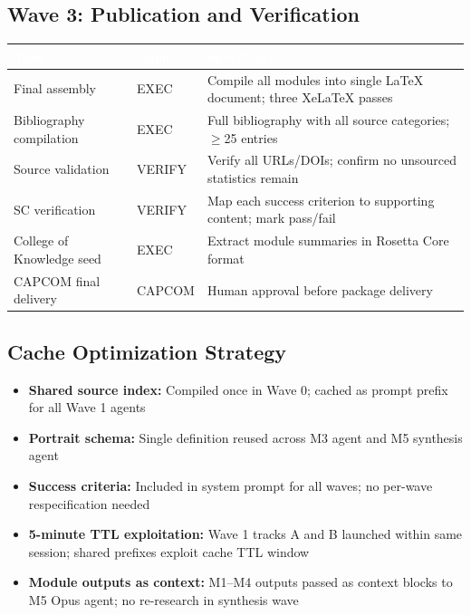 \documentclass[11pt,letterpaper]{article}
\newcommand{\tableheader}[1]{\textbf{\sffamily\textcolor{white}{#1}}}
\begin{document}
\subsection{Wave 3: Publication and Verification}

\begin{center}
\begin{tabularx}{\textwidth}{L{3cm}L{2cm}X}
\toprule
{}
\tableheader{Task} & \tableheader{Agent} & \tableheader{Specification} \\
\midrule
Final assembly & EXEC & Compile all modules into single LaTeX document; three XeLaTeX passes \\
Bibliography compilation & EXEC & Full bibliography with all source categories; $\geq$25 entries \\
Source validation & VERIFY & Verify all URLs/DOIs; confirm no unsourced statistics remain \\
SC verification & VERIFY & Map each success criterion to supporting content; mark pass/fail \\
College of Knowledge seed & EXEC & Extract module summaries in Rosetta Core format \\
CAPCOM final delivery & CAPCOM & Human approval before package delivery \\
\bottomrule
\end{tabularx}
\end{center}

\subsection{Cache Optimization Strategy}

\begin{itemize}[leftmargin=*]
  \item \textbf{Shared source index:} Compiled once in Wave 0; cached as prompt prefix for all Wave 1 agents
  \item \textbf{Portrait schema:} Single definition reused across M3 agent and M5 synthesis agent
  \item \textbf{Success criteria:} Included in system prompt for all waves; no per-wave respecification needed
  \item \textbf{5-minute TTL exploitation:} Wave 1 tracks A and B launched within same session; shared prefixes exploit cache TTL window
  \item \textbf{Module outputs as context:} M1--M4 outputs passed as context blocks to M5 Opus agent; no re-research in synthesis wave
\end{itemize}
\end{document}
